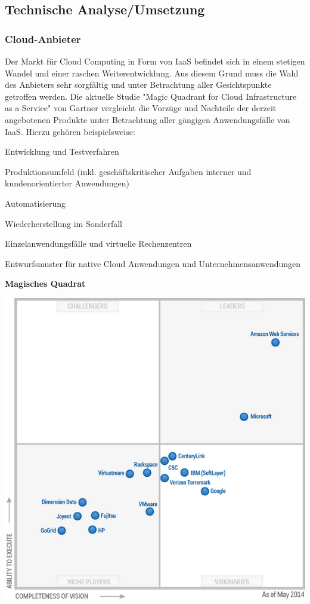 \documentclass[12pt,a4paper,bibliography=totocnumbered,listof=totocnumbered]{scrartcl}
\begin{document}
\subsection{Technische Analyse/Umsetzung}

\subsubsection{Cloud-Anbieter}
Der Markt für Cloud Computing in Form von IaaS befindet sich in einem stetigen Wandel und einer raschen Weiterentwicklung. Aus diesem Grund muss die Wahl des Anbieters sehr sorgfältig und unter Betrachtung aller Gesichtspunkte getroffen werden. Die aktuelle Studie "Magic Quadrant for Cloud Infrastructure as a Service" von Gartner \cite{30} vergleicht die Vorzüge und Nachteile der derzeit angebotenen Produkte unter Betrachtung aller gängigen Anwendungsfälle von IaaS. Hierzu gehören beispielsweise:
\begin{compactitem}
	\item Entwicklung und Testverfahren
	\item Produktionsumfeld (inkl. geschäftskritischer Aufgaben interner und kundenorientierter Anwendungen)
	\item Automatisierung
	\item Wiederherstellung im Sonderfall
	\item Einzelanwendungsfälle und virtuelle Rechenzentren
	\item Entwurfsmuster für native Cloud Anwendungen und Unternehmensanwendungen
\end{compactitem}

\textbf{Magisches Quadrat}
\vspace{1em}
$\;$\\
\begin{minipage}{\linewidth}
	\centering
	\includegraphics[width=0.7\linewidth]{Gartner_Magic_Square.png}
	\label{Gartner}
\end{minipage}
\vspace{1em}
\end{document}
